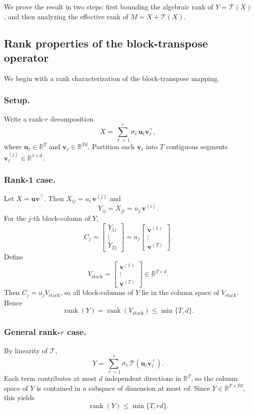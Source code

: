 \documentclass[sigconf,screen]{acmart}
\begin{document}
We prove the result in two steps: first bounding the algebraic rank of $Y=\mathcal T(X)$, and then analyzing the effective rank of $M=X+\mathcal T(X)$.

\subsection{Rank properties of the block-transpose operator}

We begin with a rank characterization of the block-transpose mapping.

\subsubsection*{\bf Setup.}
Write a rank-$r$ decomposition
\[
X=\sum_{\ell=1}^r \sigma_\ell\,\mathbf u_\ell \mathbf v_\ell^\top,
\]
where $\mathbf u_\ell\in\mathbb R^T$ and $\mathbf v_\ell\in\mathbb R^{Td}$. Partition each $\mathbf v_\ell$ into $T$ contiguous segments $\mathbf v_\ell^{(j)}\in\mathbb R^{1\times d}$.

\subsubsection*{\bf Rank-1 case.}
Let $X=\mathbf u\mathbf v^\top$. Then $X_{ij}=u_i\,\mathbf v^{(j)}$ and
\[
Y_{ij}=X_{ji}=u_j\,\mathbf v^{(i)}.
\]
For the $j$-th block-column of $Y$,
\[
C_j
=
\begin{bmatrix}
Y_{1j}\\ \vdots\\ Y_{Tj}
\end{bmatrix}
=
u_j
\begin{bmatrix}
\mathbf v^{(1)}\\ \vdots\\ \mathbf v^{(T)}
\end{bmatrix}.
\]
Define
\[
V_{\mathrm{stack}}
=
\begin{bmatrix}
\mathbf v^{(1)}\\ \vdots\\ \mathbf v^{(T)}
\end{bmatrix}
\in\mathbb R^{T\times d}.
\]
Then $C_j=u_j V_{\mathrm{stack}}$, so all block-columns of $Y$ lie in the column space of $V_{\mathrm{stack}}$. Hence
\[
\operatorname{rank}(Y)
=
\operatorname{rank}(V_{\mathrm{stack}})
\le \min\{T,d\}.
\]

\subsubsection*{\bf General rank-$r$ case.}
By linearity of $\mathcal T$,
\[
Y=\sum_{\ell=1}^r
\sigma_\ell\,\mathcal T(\mathbf u_\ell\mathbf v_\ell^\top).
\]
Each term contributes at most $d$ independent directions in $\mathbb R^T$, so the column space of $Y$ is contained in a subspace of dimension at most $rd$. Since $Y\in\mathbb R^{T\times Td}$, this yields
\[
\operatorname{rank}(Y)\le \min\{T,rd\}.
\]
\end{document}
